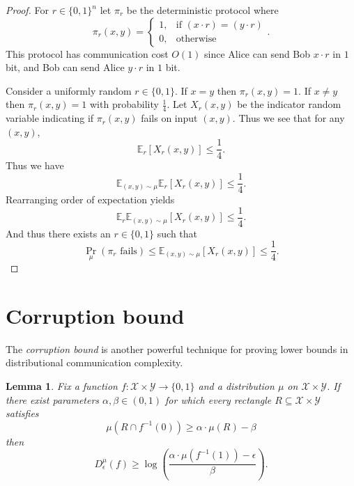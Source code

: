 \documentclass[11pt]{amsart}
\theoremstyle{plain}
\newtheorem{lemma}{Lemma}
\theoremstyle{definition}
\theoremstyle{plain}
\newcommand{\calX}{\mathcal{X}}
\newcommand{\calY}{\mathcal{Y}}
\begin{document}
\begin{proof}
For $r \in \{0,1\}^n$ let  $\pi_r$ be the deterministic protocol where 
$$\pi_r(x,y) = \begin{cases} 1, &\text{if } (x\cdot r)  = (y\cdot r) \\ 0, &\text{otherwise}\end{cases}.$$
This protocol has communication cost $O(1)$ since Alice can send Bob $x\cdot r$ in $1$ bit, and Bob can send Alice $y \cdot r$ in $1$ bit.

Consider a uniformly random $r \in \{0,1\}$. If $x=y$ then $\pi_r(x,y) = 1$. If $x\neq y$ then $\pi_r(x,y) =1$ with probability $\frac{1}{4}$. Let $X_r(x,y)$ be the indicator random variable indicating if $\pi_r(x,y)$ fails on input $(x,y)$. Thus we see that for any $(x,y)$,
$$\mathbb{E}_r[X_r(x,y)] \leq \frac{1}{4}.$$
Thus we have
$$\mathbb{E}_{(x,y)\sim \mu}\mathbb{E}_r[X_r(x,y)] \leq \frac{1}{4}.$$
Rearranging order of expectation yields
$$\mathbb{E}_{r}\mathbb{E}_{(x,y)\sim \mu}[X_r(x,y)] \leq \frac{1}{4}.$$
And thus there exists an $r \in \{0,1\}$ such that
$$\Pr_\mu(\pi_r \text{ fails}) \leq \mathbb{E}_{(x,y)\sim \mu}[X_r(x,y)] \leq \frac{1}{4}.$$
\end{proof}



\newpage \section{Corruption bound}

The \emph{corruption bound} is another powerful technique for proving lower bounds in distributional communication complexity.

\begin{lemma}
Fix a function $f : \calX \times \calY \to \{0,1\}$ and a distribution
$\mu$ on $\calX \times \calY$.
If there exist parameters $\alpha, \beta \in (0,1)$ for which
every rectangle $R \subseteq \calX \times \calY$ satisfies 
\[
\mu(R \cap f^{-1}(0)) \ge \alpha \cdot \mu(R) - \beta
\]
then
\[
D^\mu_\epsilon(f) \ge \log\left( \frac{\alpha \cdot \mu(f^{-1}(1)) - \epsilon}{\beta}\right).
\]
\end{lemma}
\end{document}

